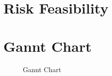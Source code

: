 \documentclass[12pt, a4paper]{article}
\begin{document}
    \section{Risk Feasibility}

    \pagebreak
    \section{Gannt Chart}
    
        \begin{figure}[H]\centering
                \caption{Gannt Chart}
        \end{figure}



            
\end{document}
